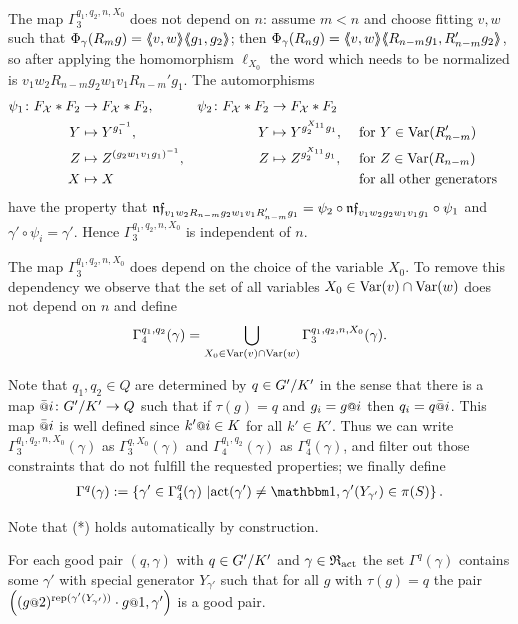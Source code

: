 \documentclass[a4paper,11pt]{amsart}
\begin{document}
The map $\Gamma_3^{q_1,q_2,n,X_0}$ does not depend on $n$: assume
$m<n$ and choose fitting $v,w$ such that
$\Phi_\gamma(R_mg)=\langle\negthickspace\langle v,w\rangle\negthickspace\rangle\langle\negthickspace\langle g_1,g_2\rangle\negthickspace\rangle$; then
$\Phi_\gamma(R_ng)=\langle\negthickspace\langle v,w\rangle\negthickspace\rangle\langle\negthickspace\langle R_{n-m}g_1,R_{n-m}'g_2\rangle\negthickspace\rangle$, so after
applying the homomorphism $\ell_{X_0}$ the word which needs to be
normalized is $v_1w_2R_{n-m}g_2w_1v_1R_{n-m}'g_1$. The automorphisms
\begin{align*}
  \psi_1 \colon F_{\mathcal{X}}*F_2 &\to F_{\mathcal{X}}*F_2, & \psi_2 \colon F_{\mathcal{X}}*F_2 &\to F_{\mathcal{X}}*F_2\\
 Y &\mapsto Y^{g_1^{-1}}, & Y &\mapsto Y^{g_2^{X_{11}}g_1}, & &\text{ for }Y\in \textup{Var}(R_{n-m}')\\
 Z &\mapsto Z^{(g_2w_1v_1g_1)^{-1}},& Z &\mapsto Z^{g_2^{X_{11}}g_1},  & &\text{ for }Z\in \textup{Var}(R_{n-m})\\
  X &\mapsto X & & & &\text{ for all other generators}
\end{align*}
have the property that
$\mathfrak{nf}_{v_1w_2R_{n-m}g_2w_1v_1R_{n-m}'g_1} =
\psi_2\circ\mathfrak{nf}_{v_1w_2g_2w_1v_1g_1}\circ \psi_1$ and
$\gamma' \circ \psi_i = \gamma'$. Hence $\Gamma_3^{q_1,q_2,n,X_0}$ is
independent of $n$.
 
The map $\Gamma_3^{q_1,q_2,n,X_0}$ does depend on the choice of the
variable $X_0$.  To remove this dependency we observe that the set of
all variables $X_0 \in \textup{Var}(v)\cap \textup{Var}(w)$ does not depend on $n$ and
define
\[\Gamma_4^{q_1,q_2}(\gamma)=  \bigcup_{X_0\in \textup{Var}(v)\cap\textup{Var}(w)}\Gamma_3^{q_1,q_2,n,X_0}(\gamma).\]

Note that $q_{1},q_2\in Q$ are determined by $q\in{G'/K'}$ in the
sense that there is a map $\att{i}\colon \RNK{G'}{K'}\to Q$ such that
if $\tau(g) = q$ and $g_i=g\at{i}$ then $q_i = q\att{i}$. This map $\att{i}$ is well defined since $k'\at{i}\in K$ for all $k'\in K'$. Thus we can write
$\Gamma_3^{q_1,q_2,n,X_0}(\gamma)$ as $\Gamma_3^{q,X_0}(\gamma)$ and
$\Gamma_4^{q_1,q_2}(\gamma)$ as $\Gamma_4^q(\gamma)$, and filter out
those constraints that do not fulfill the requested properties; we
finally define
 \begin{align}
 \Gamma^q(\gamma) := \left\{\gamma' \in \Gamma_4^q(\gamma) \bigmid 
  \act(\gamma')\neq\id, \gamma'({Y_{\gamma'}}) \in \pi(S) \right\}. 
  \label{def:Gammaq}
 \end{align}

Note that (*) holds automatically by construction.
\begin{pro}\label{pro:existsNextPair}
 For each good pair $(q,\gamma)$ with $q\in{G'/K'}$ and $\gamma\in\mathfrak{R}_{\operatorname{act}}$ the set $\Gamma^q(\gamma)$ 
 contains some $\gamma'$ with special generator $Y_{\gamma'}$ such that for all $g$ with $\tau(g)=q$ the
 pair $\left((g\at{2})^{\rep(\gamma'(Y_{\gamma'}))}\cdot g\at{1},\gamma'\right)$ is a good pair.
\end{pro}
\end{document}
